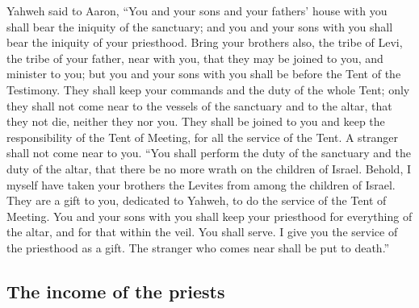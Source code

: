  Yahweh said to Aaron, ``You and your sons and your
fathers' house with you shall bear the iniquity of the sanctuary; and
you and your sons with you shall bear the iniquity of your priesthood.
 Bring your brothers also, the tribe of Levi, the tribe of
your father, near with you, that they may be joined to you, and minister
to you; but you and your sons with you shall be before the Tent of the
Testimony.  They shall keep your commands and the duty of
the whole Tent; only they shall not come near to the vessels of the
sanctuary and to the altar, that they not die, neither they nor you.
 They shall be joined to you and keep the responsibility
of the Tent of Meeting, for all the service of the Tent. A stranger
shall not come near to you.  ``You shall perform the duty
of the sanctuary and the duty of the altar, that there be no more wrath
on the children of Israel.  Behold, I myself have taken
your brothers the Levites from among the children of Israel. They are a
gift to you, dedicated to Yahweh, to do the service of the Tent of
Meeting.  You and your sons with you shall keep your
priesthood for everything of the altar, and for that within the veil.
You shall serve. I give you the service of the priesthood as a gift. The
stranger who comes near shall be put to death.''

\hypertarget{the-income-of-the-priests}{%
\subsection{The income of the priests}\label{the-income-of-the-priests}}


